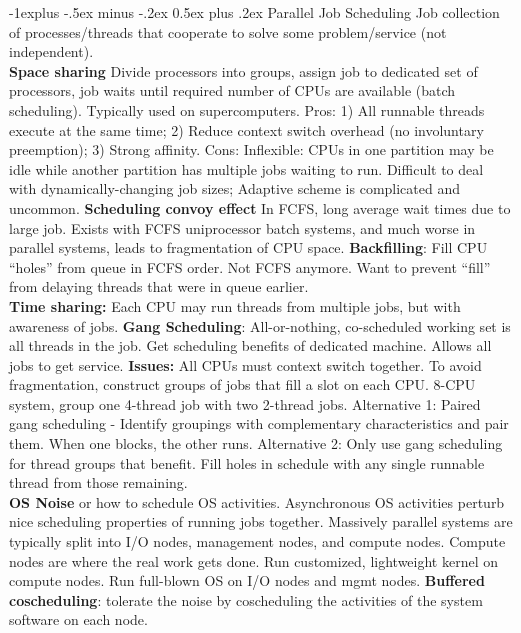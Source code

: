 \documentclass[9pt,landscape]{article}
\makeatletter
\renewcommand{\subsection}{\@startsection{subsection}{2}{0mm}%
                                {-1explus -.5ex minus -.2ex}%
                                {0.5ex plus .2ex}%
                                {\normalfont\normalsize\bfseries}}
\makeatother
\begin{document}
\raggedright
\footnotesize
\begin{multicols}{3}


\setlength{\premulticols}{1pt}
\setlength{\postmulticols}{1pt}
\setlength{\multicolsep}{1pt}
\setlength{\columnsep}{2pt}

\subsection{Parallel Job Scheduling}
Job collection of processes/threads that cooperate to solve some problem/service (not independent).\\
{\bf Space sharing} Divide processors into groups, assign job to dedicated set of processors, job waits until required number of CPUs are available (batch scheduling). Typically used on supercomputers.
Pros: 1) All runnable threads execute at the same time; 2) Reduce context switch overhead (no involuntary preemption); 3) Strong affinity. 
Cons: Inflexible: CPUs in one partition may be idle while another partition has multiple jobs waiting to run. Difficult to deal with dynamically-changing job sizes; Adaptive scheme is complicated and uncommon.
{\bf Scheduling convoy effect} In FCFS, long average wait times due to large job. Exists with FCFS uniprocessor batch systems, and much worse in parallel systems, leads to fragmentation of CPU space.
{\bf Backfilling}: Fill CPU “holes” from queue in FCFS order. Not FCFS anymore. Want to prevent ``fill'' from delaying threads that were in queue earlier.\\
{\bf Time sharing:} Each CPU may run threads from multiple jobs, but with awareness of jobs.
{\bf Gang Scheduling}: All-or-nothing, co-scheduled working set is all threads in the job. Get scheduling benefits of dedicated machine. Allows all jobs to get service. {\bf Issues:} All CPUs must context switch together. To avoid fragmentation, construct groups of jobs that fill a slot on each CPU. 8-CPU system, group one 4-thread job with two 2-thread jobs. Alternative 1: Paired gang scheduling - Identify groupings with complementary characteristics and pair them. When one blocks, the other runs. Alternative 2: Only use gang scheduling for thread groups that benefit. Fill holes in schedule with any single runnable thread from those remaining.\\
{\bf OS Noise} or how to schedule OS activities. Asynchronous OS activities perturb nice scheduling properties of running jobs together. Massively parallel systems are typically split into I/O nodes, management nodes, and compute nodes. Compute nodes are where the real work gets done. Run customized, lightweight kernel on compute nodes. Run full-blown OS on I/O nodes and mgmt nodes. {\bf Buffered coscheduling}: tolerate the noise by coscheduling the activities of the system software on each node.


\end{multicols}
\end{document}
